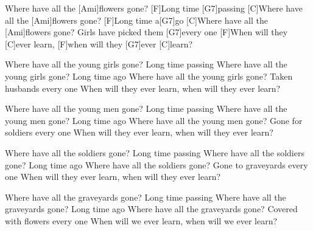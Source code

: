 
\sloka
[C]Where have all the [Ami]flowers gone? [F]Long time [G7]passing
[C]Where have all the [Ami]flowers gone? [F]Long time a[G7]go
[C]Where have all the [Ami]flowers gone?
\quad [F]Girls have picked them [G7]every one
[F]When will they [C]ever learn, [F]when will they [G7]ever [C]learn?

\sloka
Where have all the young girls gone? Long time passing
Where have all the young girls gone? Long time ago
Where have all the young girls gone? Taken husbands every one
When will they ever learn, when will they ever learn?

\sloka
Where have all the young men gone? Long time passing
Where have all the young men gone? Long time ago
Where have all the young men gone? Gone for soldiers every one
When will they ever learn, when will they ever learn?

\sloka
Where have all the soldiers gone? Long time passing
Where have all the soldiers gone? Long time ago
Where have all the soldiers gone? Gone to graveyards every one
When will they ever learn, when will they ever learn?

\sloka
Where have all the graveyards gone? Long time passing
Where have all the graveyards gone? Long time ago
Where have all the graveyards gone?
\quad Covered with flowers every one
When will we ever learn, when will we ever learn?
